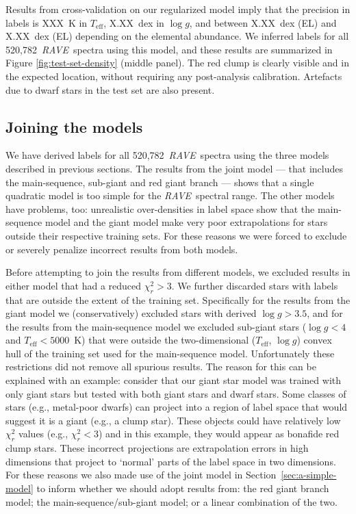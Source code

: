 \documentclass[preprint,trackchanges]{aastex}
\newcommand{\acronym}[1]{{\small{#1}}}
\newcommand{\project}[1]{\textsl{#1}}
\newcommand{\rave}{\project{\acronym{RAVE}}}
\newcommand{\teff}{T_{\mathrm{eff}}}
\newcommand{\logg}{\log g}
\newcommand{\Nspectra}{520,782}
\begin{document}
Results from cross-validation on our regularized model imply that the precision
in labels is XXX~K in $\teff$, X.XX~dex in $\logg$, and between X.XX~dex (EL) and 
X.XX~dex (EL) depending on the elemental abundance.  We inferred labels for all
\Nspectra\ \rave\ spectra using this model, and these results are summarized in
Figure \ref{fig:test-set-density} (middle panel).  The red clump is clearly visible
and in the expected location, without requiring any post-analysis calibration.
Artefacts due to dwarf stars in the test set are also present.


\subsection{Joining the models}
\label{sec:joining-the-models}

We have derived labels for all \Nspectra\ \rave\ spectra using the three models
described in previous sections.  The results from the joint model --- that includes 
the main-sequence, sub-giant and red giant branch --- shows that a single quadratic
model is too simple for the \rave\ spectral range.  The other models have problems,
too: unrealistic over-densities in label space show that the main-sequence model and
the giant model make very poor extrapolations for stars outside their respective
training sets.  For these reasons we were forced to exclude or severely penalize 
incorrect results from both models.


Before attempting to join the results from different models, we excluded results
in either model that had a reduced $\chi_{r}^2 > 3$.  We further discarded stars with
labels that are outside the extent of the training set.  Specifically for the
results from the giant model we (conservatively) excluded stars with derived 
$\logg > 3.5$, and for the results from the main-sequence model we excluded 
sub-giant stars ($\logg < 4$ and $\teff < 5000$~K) that were outside the 
two-dimensional ($\teff$, $\logg$) convex hull of the training set used for the main-sequence model.  Unfortunately these restrictions did not remove all spurious
results.  The reason for this can be explained with an example:  consider that our 
giant star model was trained with only giant stars but tested with both giant 
stars and dwarf stars.  Some classes of stars (e.g., metal-poor dwarfs) can 
project into a region of label space that would suggest it is a giant 
(e.g., a clump star).  These objects could have relatively low $\chi_{r}^2$ values
(e.g., $\chi_{r}^2 < 3$) and in this example, they would appear as bonafide red clump 
stars.  These incorrect projections are extrapolation errors in high dimensions that
project to `normal' parts of the label space in two dimensions.  For these reasons 
we also made use of the joint model in Section~\ref{sec:a-simple-model}
to inform whether we should adopt results from: the red giant branch model; the
main-sequence/sub-giant model; or a linear combination of the two. 
\end{document}
